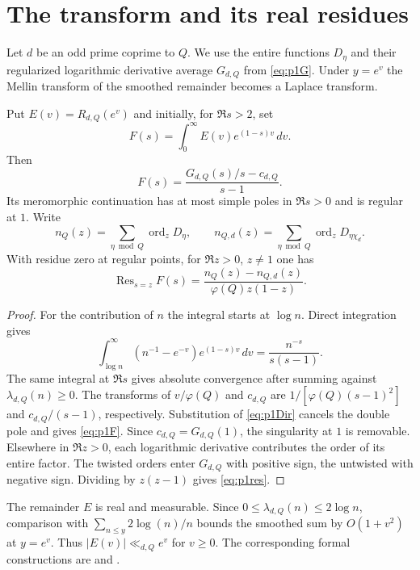 \section{The transform and its real residues}\label{sec:p1polar}
Let \(d\) be an odd prime coprime to \(Q\). We use the entire functions
\(D_\eta\) and their regularized logarithmic derivative average \(G_{d,Q}\)
from \eqref{eq:p1G}. Under \(y=e^v\) the Mellin transform of the smoothed
remainder becomes a Laplace transform.
\begin{proposition}\label{prop:p1polar}
Put $E(v)=R_{d,Q}(e^v)$ and initially, for $\Re s>2$, set
\[
 F(s)=\int_0^\infty E(v)e^{(1-s)v}\,dv.
\]
Then
\begin{equation}\label{eq:p1F}
 F(s)=\frac{G_{d,Q}(s)/s-c_{d,Q}}{s-1}.
\end{equation}
Its meromorphic continuation has at most simple poles in $\Re s>0$ and is regular at $1$. Write
\[
 n_Q(z)=\sum_{\eta\bmod Q}\operatorname{ord}_z D_\eta,
 \qquad n_{Q,d}(z)=\sum_{\eta\bmod Q}\operatorname{ord}_z D_{\eta\chi_d}.
\]
With residue zero at regular points, for $\Re z>0$, $z\ne1$ one has
\begin{equation}\label{eq:p1res}
 \operatorname{Res}_{s=z}F(s)
     =\frac{n_Q(z)-n_{Q,d}(z)}{\varphi(Q) z(1-z)} .
\end{equation}
\end{proposition}
\begin{proof}
For the contribution of $n$ the integral starts at $\log n$. Direct integration gives
\[
 \int_{\log n}^\infty (n^{-1}-e^{-v})e^{(1-s)v}\,dv
       =\frac{n^{-s}}{s(s-1)}.
\]
The same integral at \(\Re s\) gives absolute convergence after summing
against \(\lambda_{d,Q}(n)\ge0\). The transforms of \(v/\varphi(Q)\) and
\(c_{d,Q}\) are \(1/[\varphi(Q)(s-1)^2]\) and \(c_{d,Q}/(s-1)\),
respectively. Substitution of \eqref{eq:p1Dir} cancels the double pole and
gives \eqref{eq:p1F}. Since \(c_{d,Q}=G_{d,Q}(1)\), the singularity at
\(1\) is removable. Elsewhere in \(\Re z>0\), each logarithmic derivative
contributes the order of its entire factor. The twisted orders enter
\(G_{d,Q}\) with positive sign, the untwisted with negative sign.
Dividing by \(z(z-1)\) gives \eqref{eq:p1res}.
\end{proof}
The remainder \(E\) is real and measurable. Since
\(0\le\lambda_{d,Q}(n)\le2\log n\), comparison with
\(\sum_{n\le y}2\log(n)/n\) bounds the smoothed sum by \(O(1+v^2)\)
at \(y=e^v\). Thus \(|E(v)|\ll_{d,Q}e^v\) for \(v\ge0\).
The corresponding formal constructions are
 and
.

